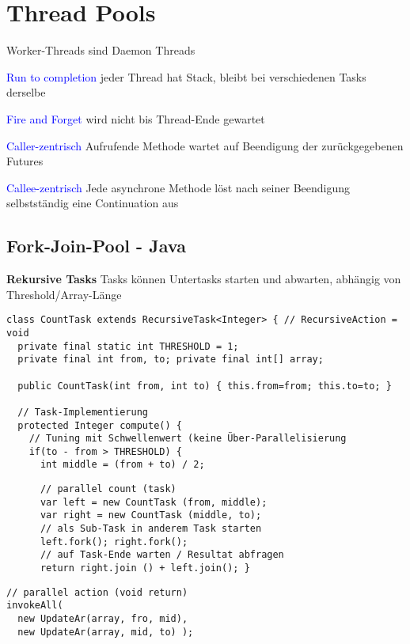 \section{Thread Pools}

Worker-Threads sind Daemon Threads

\textcolor{blue}{Run to completion} jeder Thread hat Stack, bleibt bei verschiedenen Tasks derselbe

\textcolor{blue}{Fire and Forget} wird nicht bis Thread-Ende gewartet

\textcolor{blue}{Caller-zentrisch} Aufrufende Methode wartet auf Beendigung der zurückgegebenen Futures

\textcolor{blue}{Callee-zentrisch} Jede asynchrone Methode löst nach seiner Beendigung selbstständig eine Continuation aus

\subsection{Fork-Join-Pool - Java}

\textbf{Rekursive Tasks}
Tasks können Untertasks starten und abwarten, abhängig von Threshold/Array-Länge

\begin{lstlisting}
class CountTask extends RecursiveTask<Integer> { // RecursiveAction = void
  private final static int THRESHOLD = 1;
  private final int from, to; private final int[] array;

  public CountTask(int from, int to) { this.from=from; this.to=to; }

  // Task-Implementierung
  protected Integer compute() {
    // Tuning mit Schwellenwert (keine Über-Parallelisierung
    if(to - from > THRESHOLD) {
      int middle = (from + to) / 2;
\end{lstlisting}
\begin{minipage}[t]{0.6\linewidth}
    \begin{lstlisting}
      // parallel count (task)
      var left = new CountTask (from, middle);
      var right = new CountTask (middle, to);
      // als Sub-Task in anderem Task starten
      left.fork(); right.fork();
      // auf Task-Ende warten / Resultat abfragen
      return right.join () + left.join(); }
    \end{lstlisting}
\end{minipage}
\begin{minipage}[t]{0.39\linewidth}
    \begin{lstlisting}
// parallel action (void return)
invokeAll(
  new UpdateAr(array, fro, mid),
  new UpdateAr(array, mid, to) );
    \end{lstlisting}
\end{minipage}

